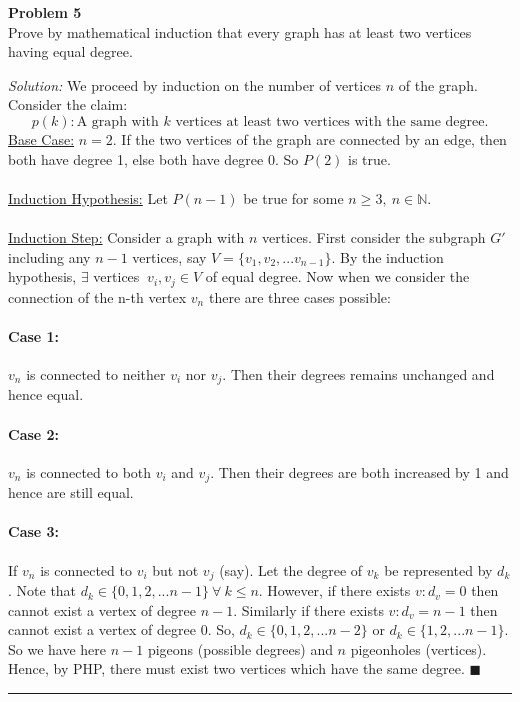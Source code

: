 \documentclass[a4paper, 11pt]{article}
\newenvironment{problem}[2][Problem]
    { \begin{mdframed}[backgroundcolor=gray!20] \textbf{#1 #2} \\}
    {  \end{mdframed}}
\newenvironment{solution}
    {\textit{Solution:}}
    {}
\newcommand{\hr}{\noindent\rule{7in}{2.8pt}}
\begin{document}
\begin{problem}{5}
Prove by mathematical induction that every graph has at least two vertices having equal degree.
\end{problem}
\begin{solution} We proceed by induction on the number of vertices $n$ of the graph. Consider the claim: 
$$
    p(k): \text{A graph with } k \text{ vertices at least two vertices with the same degree.}
$$
\underline{Base Case:} $n=2$. If the two vertices of the graph are connected by an edge, then both have degree 1, else both have degree 0. So $P(2)$ is true.
\\
\\
\underline{Induction Hypothesis:} Let $P(n-1)$ be true for some $n \geq 3, \ n \in \mathbb{N}$.
\\
\\
\underline{Induction Step:} Consider a graph with $n$ vertices. First consider the subgraph $G'$ including any $n-1$ vertices, say $V = \{ v_1,v_2,...v_{n-1} \}$. By the induction hypothesis, $\exists$ vertices $\ v_i, v_j \in V$ of equal degree. Now when we consider the connection of the n-th vertex $v_n$ there are three cases possible: 
\paragraph{Case 1:} $v_n$ is connected to neither $v_i$ nor $v_j$. Then their degrees remains unchanged and hence equal.
\paragraph{Case 2:} $v_n$ is connected to both $v_i$ and $v_j$. Then their degrees are both increased by 1 and hence are still equal.
\paragraph{Case 3:} If $v_n$ is connected to $v_i$ but not $v_j$ (say). Let the degree of $v_k$ be represented by $d_k$. Note that $d_k \in \{ 0, 1, 2, ... n-1 \} \ \forall \ k \leq n$. However, if there exists $v: d_v = 0$ then cannot exist a vertex of degree $n-1$. Similarly if there exists $v: d_v = n-1$ then cannot exist a vertex of degree $0$. So, $d_k \in \{ 0, 1, 2, ... n-2 \}$ or $d_k \in \{ 1, 2, ... n-1 \}$. So we have here $n-1$ pigeons (possible degrees) and $n$ pigeonholes (vertices). Hence, by PHP, there must exist two vertices which have the same degree. $\blacksquare$
\end{solution} 
\\
\hr
\end{document}
